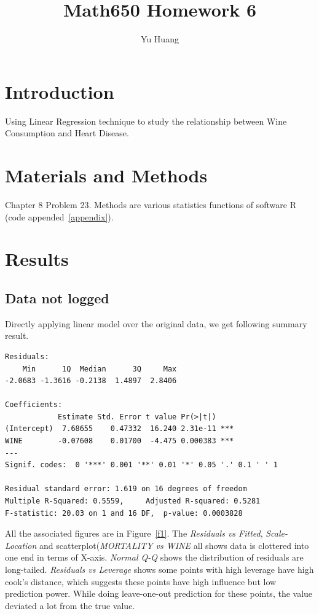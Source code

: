 \documentclass[a4paper,10pt]{article}
\title{Math650 Homework 6}
\author{Yu Huang}
\date{}
\begin{document}
\maketitle

\begin{abstract}

\end{abstract}

\section{Introduction}
Using Linear Regression technique to study the relationship between Wine Consumption and Heart Disease.

\section{Materials and Methods}
Chapter 8 Problem 23. Methods are various statistics functions of software R (code appended~\ref{appendix}).

\section{Results}
\subsection{Data not logged}
Directly applying linear model over the original data, we get following summary result.
\begin{verbatim}
Residuals:
    Min      1Q  Median      3Q     Max
-2.0683 -1.3616 -0.2138  1.4897  2.8406

Coefficients:
            Estimate Std. Error t value Pr(>|t|)
(Intercept)  7.68655    0.47332  16.240 2.31e-11 ***
WINE        -0.07608    0.01700  -4.475 0.000383 ***
---
Signif. codes:  0 '***' 0.001 '**' 0.01 '*' 0.05 '.' 0.1 ' ' 1

Residual standard error: 1.619 on 16 degrees of freedom
Multiple R-Squared: 0.5559,     Adjusted R-squared: 0.5281
F-statistic: 20.03 on 1 and 16 DF,  p-value: 0.0003828
\end{verbatim}

All the associated figures are in Figure~\ref{f1}. The \emph{Residuals vs Fitted}, \emph{Scale-Location} and scatterplot(\emph{MORTALITY vs WINE} all shows data is clottered into one end in terms of X-axis. \emph{Normal Q-Q} shows the distribution of residuals are long-tailed. \emph{Residuals vs Leverage} shows some points with high leverage have high cook's distance, which suggests these points have high influence but low prediction power. While doing leave-one-out prediction for these points, the value deviated a lot from the true value.
\end{document}

